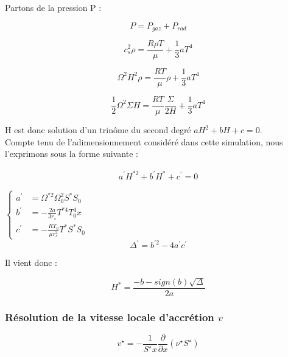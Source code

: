 Partons de la pression P : 

\begin{equation}
	P = P_{gaz} + P_{rad}
\end{equation}


\begin{equation}
	c_{s}^{2} \rho = \frac{R \rho T}{\mu} + \frac{1}{3} a T^{4}
\end{equation}


\begin{equation}
	\Omega^{2} H^{2} \rho = \frac{R T}{\mu} \rho + \frac{1}{3} a T^{4}
\end{equation}


\begin{equation}
	\frac{1}{2} \Omega^{2} \Sigma H = \frac{R T}{\mu} \frac{\Sigma}{2 H} + \frac{1}{3} a T^{4}
\end{equation}

H est donc solution d'un trinôme du second degré $ a H^{2} + b H + c = 0$. \\
Compte tenu de l'adimensionnement considéré dans cette simulation, nous l'exprimons sous la forme suivante :  

\begin{eqnarray}
  a^{\prime} H^{* 2}+b^{\prime}H^{*}+c^{\prime}=0
  \end{eqnarray}

$\begin{cases}  
      a^{\prime} &= \Omega^{*2} \Omega_{0}^{2} S^{*} S_{0}\\
      b^{\prime} &= - \frac{2 a}{3 r_{s}} T^{*4} T_{0}^{4} x \\
      c^{\prime}&=-\frac{RT_{0}}{\mu r_{s}^{2}} T^{*} S^{*} S_{0}
     \end{cases}$ \\


\begin{equation}
	\Delta^{\prime} = b^{\prime 2} - 4a^{\prime}c^{\prime}
\end{equation} 

Il vient donc : 

\begin{equation}
	H^{*} = \frac{-b -sign(b) \sqrt{\Delta}}{2a}
\end{equation}


\subsubsection{Résolution de la vitesse locale d'accrétion $v$}
\begin{equation}
    v^\star = - \frac{1}{S^\star x} \frac{\partial}{\partial x} \left(\nu^\star S^\star\right)
\end{equation} 

